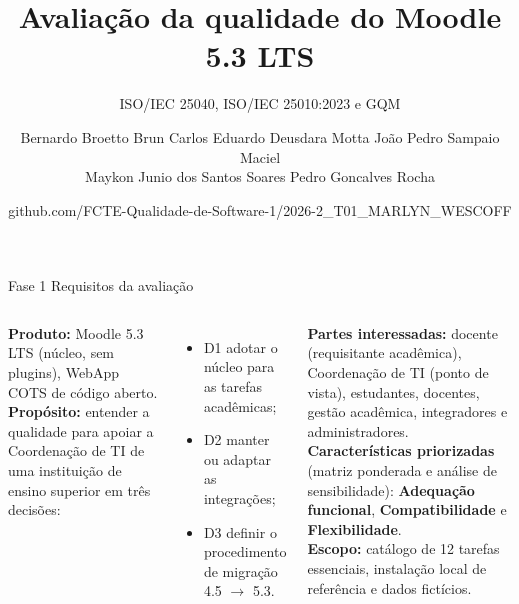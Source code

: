 \documentclass[aspectratio=169,10pt]{beamer}
\title{Avaliação da qualidade do Moodle 5.3 LTS}
\subtitle{ISO/IEC 25040, ISO/IEC 25010:2023 e GQM}
\author{Bernardo Broetto Brun \textperiodcentered{} Carlos Eduardo Deusdara Motta \textperiodcentered{} João Pedro Sampaio Maciel\\Maykon Junio dos Santos Soares \textperiodcentered{} Pedro Goncalves Rocha}
\institute{Grupo Marlyn Wescoff \textperiodcentered{} Qualidade de Software 1 \textperiodcentered{} FCTE/UnB \textperiodcentered{} 2026/2}
\date{github.com/FCTE-Qualidade-de-Software-1/2026-2\_T01\_MARLYN\_WESCOFF}
\begin{document}
\begin{frame}\titlepage\end{frame}

\begin{frame}{Fase 1 \textperiodcentered{} Requisitos da avaliação}
\begin{columns}[T]
\textbf{Produto:} Moodle 5.3 LTS (núcleo, sem plugins), WebApp COTS de código aberto.\\[0.5em]
\textbf{Propósito:} entender a qualidade para apoiar a Coordenação de TI de uma instituição de ensino superior em três decisões:
\begin{itemize}\small
\item D1 adotar o núcleo para as tarefas acadêmicas;
\item D2 manter ou adaptar as integrações;
\item D3 definir o procedimento de migração 4.5 $\rightarrow$ 5.3.
\end{itemize}
\textbf{Partes interessadas:} docente (requisitante acadêmica), Coordenação de TI (ponto de vista), estudantes, docentes, gestão acadêmica, integradores e administradores.\\[0.5em]
\textbf{Características priorizadas} (matriz ponderada e análise de sensibilidade): \textbf{Adequação funcional}, \textbf{Compatibilidade} e \textbf{Flexibilidade}.\\[0.5em]
\textbf{Escopo:} catálogo de 12 tarefas essenciais, instalação local de referência e dados fictícios.
\end{columns}
\end{frame}
\end{document}
